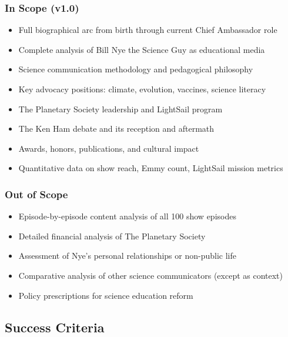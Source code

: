 \documentclass[11pt,letterpaper]{article}
\begin{document}
\subsubsection*{In Scope (v1.0)}
\begin{itemize}[leftmargin=*]
  \item Full biographical arc from birth through current Chief Ambassador role
  \item Complete analysis of Bill Nye the Science Guy as educational media
  \item Science communication methodology and pedagogical philosophy
  \item Key advocacy positions: climate, evolution, vaccines, science literacy
  \item The Planetary Society leadership and LightSail program
  \item The Ken Ham debate and its reception and aftermath
  \item Awards, honors, publications, and cultural impact
  \item Quantitative data on show reach, Emmy count, LightSail mission metrics
\end{itemize}

\subsubsection*{Out of Scope}
\begin{itemize}[leftmargin=*]
  \item Episode-by-episode content analysis of all 100 show episodes
  \item Detailed financial analysis of The Planetary Society
  \item Assessment of Nye's personal relationships or non-public life
  \item Comparative analysis of other science communicators (except as context)
  \item Policy prescriptions for science education reform
\end{itemize}

\subsection{Success Criteria}
\end{document}
